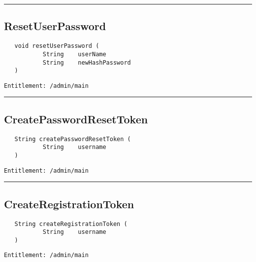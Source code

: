 \rule{12cm}{2pt}
\subsection{ResetUserPassword}
\label{Api:ResetUserPassword}
\begin{Verbatim}
   void resetUserPassword (
           String    userName
           String    newHashPassword
   )
\end{Verbatim}
\begin{Verbatim}[formatcom=\color{Maroon}]
  Entitlement: /admin/main
\end{Verbatim}



\rule{12cm}{2pt}
\subsection{CreatePasswordResetToken}
\label{Api:CreatePasswordResetToken}
\begin{Verbatim}
   String createPasswordResetToken (
           String    username
   )
\end{Verbatim}
\begin{Verbatim}[formatcom=\color{Maroon}]
  Entitlement: /admin/main
\end{Verbatim}



\rule{12cm}{2pt}
\subsection{CreateRegistrationToken}
\label{Api:CreateRegistrationToken}
\begin{Verbatim}
   String createRegistrationToken (
           String    username
   )
\end{Verbatim}
\begin{Verbatim}[formatcom=\color{Maroon}]
  Entitlement: /admin/main
\end{Verbatim}



